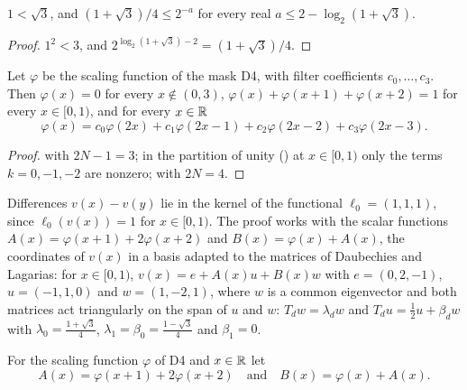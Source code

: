\begin{lemma}
\label{lem:daub-d4-rate}
\leanok
$1 < \sqrt 3$, and $(1 + \sqrt 3)/4 \leq 2^{-a}$ for every real $a \leq 2 - \log_2(1 + \sqrt 3)$.
\end{lemma}

\begin{proof}
\leanok
$1^2 < 3$, and $2^{\log_2(1 + \sqrt 3) - 2} = (1 + \sqrt 3)/4$.
\end{proof}

\begin{lemma}
\label{lem:daub-d4-scaling}
\leanok
{}
Let $\varphi$ be the scaling function of the mask D4, with filter coefficients
$c_0, \dots, c_3$. Then $\varphi(x) = 0$ for every $x \notin (0, 3)$,
$\varphi(x) + \varphi(x + 1) + \varphi(x + 2) = 1$ for every $x \in [0, 1)$, and for every
$x \in \mathbb{R}$
\[
  \varphi(x) = c_0 \varphi(2x) + c_1 \varphi(2x - 1) + c_2 \varphi(2x - 2) + c_3 \varphi(2x - 3) .
\]
\end{lemma}

\begin{proof}
\leanok
{}
 with $2N - 1 = 3$; in the partition of unity
() at $x \in [0, 1)$ only the terms $k = 0, -1, -2$ are
nonzero;  with $2N = 4$.
\end{proof}

Differences $v(x) - v(y)$ lie in the kernel of the functional $\ell_0 = (1, 1, 1)$, since
$\ell_0(v(x)) = 1$ for $x \in [0, 1)$. The proof works with the scalar functions
$A(x) = \varphi(x + 1) + 2 \varphi(x + 2)$ and $B(x) = \varphi(x) + A(x)$, the coordinates of
$v(x)$ in a basis adapted to the matrices of Daubechies and Lagarias: for $x \in [0, 1)$,
$v(x) = e + A(x) u + B(x) w$ with $e = (0, 2, -1)$, $u = (-1, 1, 0)$ and $w = (1, -2, 1)$, where
$w$ is a common eigenvector and both matrices act triangularly on the span of $u$ and $w$:
$T_d w = \lambda_d w$ and $T_d u = \frac12 u + \beta_d w$ with $\lambda_0 = \frac{1 + \sqrt 3}{4}$,
$\lambda_1 = \beta_0 = \frac{1 - \sqrt 3}{4}$ and $\beta_1 = 0$.

\begin{definition}
\label{def:daub-d4-coordinates}
\leanok
{}
For the scaling function $\varphi$ of D4 and $x \in \mathbb{R}$ let
\[
  A(x) = \varphi(x + 1) + 2 \varphi(x + 2) \quad\text{and}\quad B(x) = \varphi(x) + A(x) .
\]
\end{definition}

